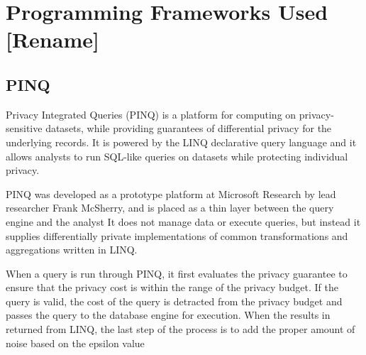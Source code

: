  \section{Programming Frameworks Used [Rename]}
 
 \subsection{PINQ}
 Privacy Integrated Queries (PINQ) is a platform for computing on privacy-sensitive datasets, while providing guarantees of differential privacy for the underlying records. It is powered by the LINQ declarative query language and it allows analysts to run SQL-like queries on datasets while protecting individual privacy. 
 
 PINQ was developed as a prototype platform at Microsoft Research by lead researcher Frank McSherry\cite{mcsherry2009PINQ}, and is placed as a thin layer between the query engine and the analyst 
  \newline
It does not manage data or execute queries, but instead it supplies differentially private implementations of common transformations and aggregations written in LINQ. 

When a query is run through PINQ, it first evaluates the privacy guarantee to ensure that the privacy cost is within the range of the privacy budget. If the query is valid, the cost of the query is detracted from the privacy budget and passes the query to the database engine for execution. When the results in returned from LINQ, the last step of the process is to add the proper amount of noise based on the epsilon value  
 
